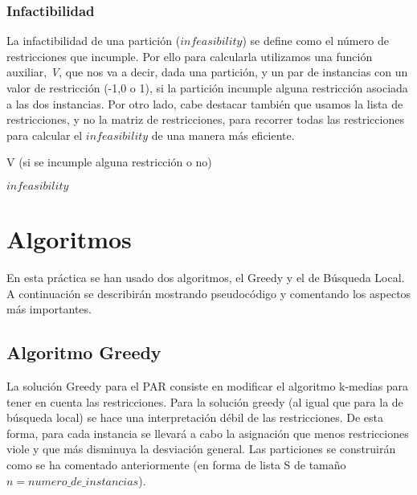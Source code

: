 \documentclass[11pt,a4paper]{article}
\begin{document}
    \subsubsection{Infactibilidad}
    La infactibilidad de una partición ($infeasibility$) se define como el número de restricciones que incumple. Por ello para calcularla utilizamos una función auxiliar, \textit{V}, que nos va a decir, dada una partición, y un par de instancias con un valor de restricción (-1,0 o 1), si la partición incumple alguna restricción asociada a las dos instancias. Por otro lado, cabe destacar también que usamos la lista de restricciones, y no la matriz de restricciones, para recorrer todas las restricciones para calcular el $infeasibility$ de una manera más eficiente.
    \begin{algorithm}
	 	\caption{V (si se incumple alguna restricción o no)}
	\end{algorithm}
	\begin{algorithm}
	 	\caption{$infeasibility$}
	\end{algorithm}
	\section{Algoritmos}
	En esta práctica se han usado dos algoritmos, el Greedy y el de Búsqueda Local. A continuación se describirán mostrando pseudocódigo y comentando los aspectos más importantes.
	\subsection{Algoritmo Greedy}
	La solución Greedy para el PAR consiste en modificar el algoritmo k-medias para tener en cuenta las restricciones. Para la solución greedy (al igual que para la de búsqueda local) se hace una interpretación débil de las restricciones. De esta forma, para cada instancia se llevará a cabo la asignación que menos restricciones viole y que más disminuya la desviación general. Las particiones se construirán como se ha comentado anteriormente (en forma de lista S de tamaño $n = numero\_de\_instancias$). 
	
\end{document}
